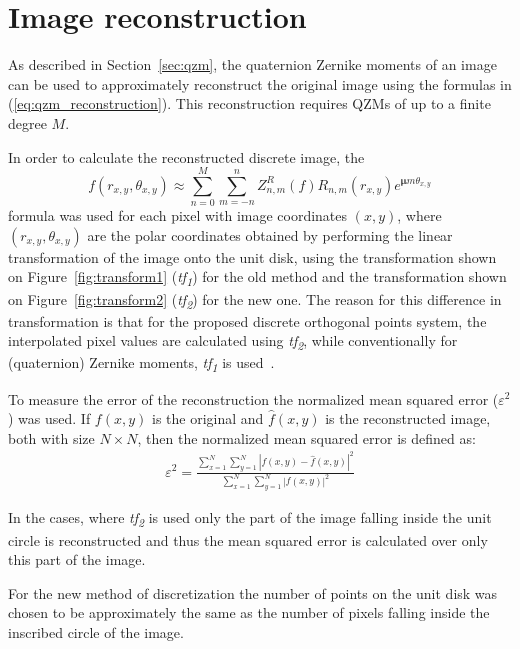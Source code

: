 \section{Image reconstruction}
As described in Section~\ref{sec:qzm}, the quaternion Zernike moments of an image can be used to approximately reconstruct the original image using the formulas in (\ref{eq:qzm_reconstruction}). This reconstruction requires QZMs of up to a finite degree $M$.

In order to calculate the reconstructed discrete image, the 
$$
f(r_{x,y},\theta_{x,y}) \approx \sum_{n=0}^{M}\sum_{m=-n}^{n}Z_{n,m}^R(f)R_{n,m}(r_{x,y})e^{\bm{\mu}m\theta_{x,y}}
$$
formula was used for each pixel with image coordinates $(x,y)$, where $(r_{x,y},\theta_{x,y})$ are the polar coordinates obtained by performing the linear transformation of the image onto the unit disk, using the transformation shown on Figure~\ref{fig:transform1} (\textit{tf\textsubscript{1}}) for the old method and the transformation shown on Figure~\ref{fig:transform2} (\textit{tf\textsubscript{2}}) for the new one. The reason for this difference in transformation is that for the proposed discrete orthogonal points system, the interpolated pixel values are calculated using \textit{tf\textsubscript{2}}, while conventionally for (quaternion) Zernike moments, \textit{tf\textsubscript{1}} is used~\cite{qzmi}.

To measure the error of the reconstruction the normalized mean squared error ($\varepsilon^2$) was used. If $f(x,y)$ is the original and $\widehat{f}(x,y)$ is the reconstructed image, both with size $N \times N$, then the normalized mean squared error is defined as:
\begin{gather*}
    \varepsilon^2 = \frac{\displaystyle \sum_{x=1}^N\sum_{y=1}^N \left|f(x,y) - \widehat{f}(x,y)\right|^2}{\displaystyle \sum_{x=1}^N\sum_{y=1}^N \left|f(x,y)\right|^2}
\end{gather*}

In the cases, where \textit{tf\textsubscript{2}} is used only the part of the image falling inside the unit circle is reconstructed and thus the mean squared error is calculated over only this part of the image.

For the new method of discretization the number of points on the unit disk was chosen to be approximately the same as the number of pixels falling inside the inscribed circle of the image. 

